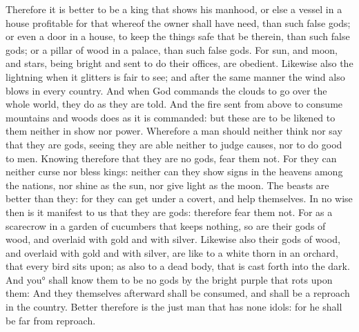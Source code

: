{Therefore it is better to be a king that shows his manhood, or else a vessel in a house profitable for that whereof the owner shall have need, than such false gods; or even a door in a house, to keep the things safe that be therein, than such false gods; or a pillar of wood in a palace, than such false gods.
For sun, and moon, and stars, being bright and sent to do their offices, are obedient.
Likewise also the lightning when it glitters is fair to see; and after the same manner the wind also blows in every country.
And when God commands the clouds to go over the whole world, they do as they are told.
And the fire sent from above to consume mountains and woods does as it is commanded: but these are to be likened to them neither in show nor power.
Wherefore a man should neither think nor say that they are gods, seeing they are able neither to judge causes, nor to do good to men.
Knowing therefore that they are no gods, fear them not.
For they can neither curse nor bless kings:
neither can they show signs in the heavens among the nations, nor shine as the sun, nor give light as the moon.
The beasts are better than they: for they can get under a covert, and help themselves.
In no wise then is it manifest to us that they are gods: therefore fear them not.
For as a scarecrow in a garden of cucumbers that keeps nothing, so are their gods of wood, and overlaid with gold and with silver.
Likewise also their gods of wood, and overlaid with gold and with silver, are like to a white thorn in an orchard, that every bird sits upon; as also to a dead body, that is cast forth into the dark.
And you° shall know them to be no gods by the
 bright purple that rots upon them: And they themselves afterward shall be consumed, and shall be a reproach in the country.
Better therefore is the just man that has none idols: for he shall be far from reproach.
\par }